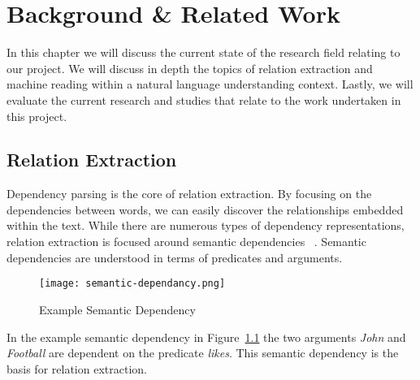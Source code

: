 \documentclass[bsc,frontabs,twoside,singlespacing,parskip,deptreport]{infthesis}     %
\begin{document}
\chapter{Background \& Related Work}\label{chapter:backgroundandrelatework}
In this chapter we will discuss the current state of the research field relating to our project.
We will discuss in depth the topics of relation extraction and machine reading within a natural language understanding
context. Lastly, we will evaluate the current research and studies that relate to the work undertaken in this project.

\section{Relation Extraction}\label{sec:IE-bg}
Dependency parsing is the core of relation extraction.
By focusing on the dependencies between words, we can easily discover the relationships embedded within the text.
While there are numerous types of dependency representations, relation extraction is focused around semantic dependencies ~\cite{mcclosky2011event}.
Semantic dependencies are understood in terms of predicates and arguments.
\begin{figure}[H]
  \centering
  \texttt{[image: semantic-dependancy.png]}
  \caption{Example Semantic Dependency}
  \label{fig:semantic-dependancy}
\end{figure}

In the example semantic dependency in Figure~\ref{fig:semantic-dependancy} the two arguments \textit{John} and \textit{Football} are dependent
on the predicate \textit{likes}. This semantic dependency is the basis for relation extraction.
\end{document}
